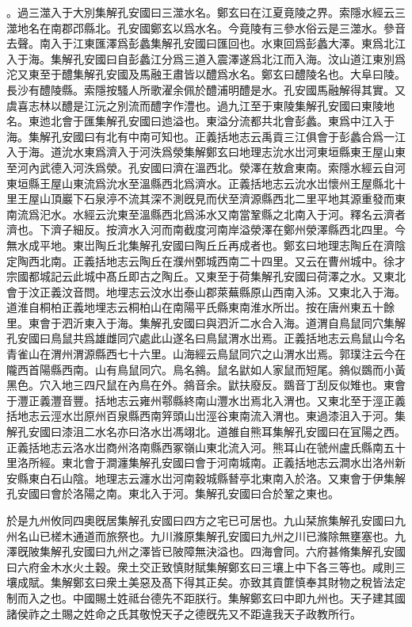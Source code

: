 。過三澨入于大別集解孔安國曰三澨水名。鄭玄曰在江夏竟陵之界。索隱水經云三澨地名在南郡邔縣北。孔安國鄭玄以爲水名。今竟陵有三參水俗云是三澨水。參音去聲。南入于江東匯澤爲彭蠡集解孔安國曰匯回也。水東回爲彭蠡大澤。東爲北江入于海。集解孔安國曰自彭蠡江分爲三道入震澤遂爲北江而入海。汶山道江東別爲沱又東至于醴集解孔安國及馬融王肅皆以醴爲水名。鄭玄曰醴陵名也。大阜曰陵。長沙有醴陵縣。索隱按騷人所歌濯余佩於醴浦明醴是水。孔安國馬融解得其實。又虞喜志林以醴是江沅之別流而醴字作澧也。過九江至于東陵集解孔安國曰東陵地名。東迆北會于匯集解孔安國曰迆溢也。東溢分流都共北會彭蠡。東爲中江入于海。集解孔安國曰有北有中南可知也。正義括地志云禹貢三江俱會于彭蠡合爲一江入于海。道沇水東爲濟入于河泆爲滎集解鄭玄曰地理志沇水岀河東垣縣東王屋山東至河內武德入河泆爲滎。孔安國曰濟在溫西北。滎澤在敖倉東南。索隱水經云自河東垣縣王屋山東流爲沇水至溫縣西北爲濟水。正義括地志云沇水岀懷州王屋縣北十里王屋山頂巖下石泉渟不流其深不測旣見而伏至濟源縣西北二里平地其源重發而東南流爲汜水。水經云沇東至溫縣西北爲泲水又南當鞏縣之北南入于河。釋名云濟者濟也。下濟子細反。按濟水入河而南截度河南岸溢滎澤在鄭州滎澤縣西北四里。今無水成平地。東岀陶丘北集解孔安國曰陶丘丘再成者也。鄭玄曰地理志陶丘在濟陰定陶西北南。正義括地志云陶丘在濮州鄄城西南二十四里。又云在曹州城中。徐才宗國都城記云此城中髙丘即古之陶丘。又東至于荷集解孔安國曰荷澤之水。又東北會于汶正義汶音問。地埋志云汶水岀泰山郡萊蕪縣原山西南入泲。又東北入于海。道淮自桐柏正義地埋志云桐柏山在南陽平氏縣東南淮水所岀。按在唐州東五十餘里。東會于泗沂東入于海。集解孔安國曰與泗沂二水合入海。道渭自鳥鼠同穴集解孔安國曰鳥鼠共爲雄雌同穴處此山遂名曰鳥鼠渭水岀焉。正義括地志云鳥鼠山今名青雀山在渭州渭源縣西七十六里。山海經云鳥鼠同穴之山渭水岀焉。郭璞注云今在隴西首陽縣西南。山有鳥鼠同穴。鳥名䳜。鼠名鼣如人家鼠而短尾。䳜似鵽而小黃黑色。穴入地三四尺鼠在內鳥在外。䳜音余。鼣扶廢反。鵽音丁刮反似雉也。東會于灃正義灃音豐。括地志云雍州鄠縣終南山灃水岀焉北入渭也。又東北至于涇正義括地志云涇水岀原州百泉縣西南笄頭山岀涇谷東南流入渭也。東過漆沮入于河。集解孔安國曰漆沮二水名亦曰洛水岀馮翊北。道雒自熊耳集解孔安國曰在冝陽之西。正義括地志云洛水岀商州洛南縣西冢嶺山東北流入河。熊耳山在虢州盧氏縣南五十里洛所經。東北會于澗瀍集解孔安國曰會于河南城南。正義括地志云澗水岀洛州新安縣東白石山陰。地理志云瀍水岀河南穀城縣朁亭北東南入於洛。又東會于伊集解孔安國曰會於洛陽之南。東北入于河。集解孔安國曰合於鞏之東也。


於是九州攸同四奧旣居集解孔安國曰四方之宅已可居也。九山栞旅集解孔安國曰九州名山已槎木通道而旅祭也。九川滌原集解孔安國曰九州之川已滌除無壅塞也。九澤旣陂集解孔安國曰九州之澤皆已陂障無決溢也。四海會同。六府甚脩集解孔安國曰六府金木水火土穀。衆土交正致慎財賦集解鄭玄曰三壤上中下各三等也。咸則三壤成賦。集解鄭玄曰衆土美惡及髙下得其正矣。亦致其貢篚慎奉其財物之稅皆法定制而入之也。中國賜土姓祗台德先不距朕行。集解鄭玄曰中即九州也。天子建其國諸侯祚之土賜之姓命之氏其敬悅天子之德旣先又不距違我天子政教所行。


